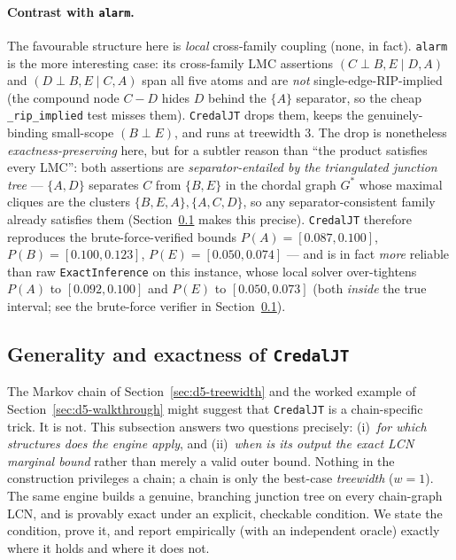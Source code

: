 \documentclass[11pt]{article}
\begin{document}
\paragraph{Contrast with \texttt{alarm}.} The favourable structure here is \emph{local}
cross-family coupling (none, in fact). \texttt{alarm} is the more interesting case: its cross-family
LMC assertions $(C\perp B,E\mid D,A)$ and $(D\perp B,E\mid C,A)$ span all five atoms and are
\emph{not} single-edge-RIP-implied (the compound node $C\!-\!D$ hides $D$ behind the $\{A\}$
separator, so the cheap \texttt{\_rip\_implied} test misses them). \texttt{CredalJT} drops them, keeps
the genuinely-binding small-scope $(B\perp E)$, and runs at treewidth $3$. The drop is nonetheless
\emph{exactness-preserving} here, but for a subtler reason than ``the product satisfies every LMC'':
both assertions are \emph{separator-entailed by the triangulated junction tree} --- $\{A,D\}$
separates $C$ from $\{B,E\}$ in the chordal graph $G^\ast$ whose maximal cliques are the clusters
$\{B,E,A\},\{A,C,D\}$, so any separator-consistent family already satisfies them
(Section~\ref{sec:d5-generality} makes this precise). \texttt{CredalJT} therefore reproduces the
brute-force-verified bounds $P(A){=}[0.087,0.100]$, $P(B){=}[0.100,0.123]$,
$P(E){=}[0.050,0.074]$ --- and is in fact \emph{more} reliable than raw \texttt{ExactInference} on
this instance, whose local solver over-tightens $P(A)$ to $[0.092,0.100]$ and $P(E)$ to
$[0.050,0.073]$ (both \emph{inside} the true interval; see the brute-force verifier in
Section~\ref{sec:d5-generality}).

\subsection{Generality and exactness of \texttt{CredalJT}}\label{sec:d5-generality}

The Markov chain of Section~\ref{sec:d5-treewidth} and the worked example of
Section~\ref{sec:d5-walkthrough} might suggest that \texttt{CredalJT} is a chain-specific trick.
It is not. This subsection answers two questions precisely:
(i)~\emph{for which structures does the engine apply}, and
(ii)~\emph{when is its output the exact LCN marginal bound} rather than merely a valid outer bound.
Nothing in the construction privileges a chain; a chain is only the best-case \emph{treewidth}
($w{=}1$). The same engine builds a genuine, branching junction tree on every chain-graph LCN, and
is provably exact under an explicit, checkable condition. We state the condition, prove it, and
report empirically (with an independent oracle) exactly where it holds and where it does not.
\end{document}
